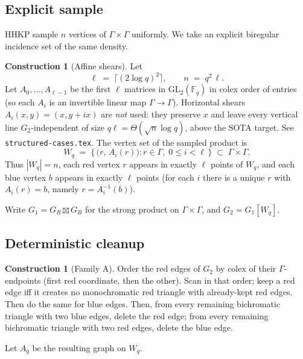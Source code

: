 \documentclass[11pt]{article}
\theoremstyle{definition}
\newtheorem{construction}[theorem]{Construction}
\newcommand{\F}{\mathbb{F}}
\begin{document}
\subsection{Explicit sample}

HHKP sample $n$ vertices of $\Gamma\times\Gamma$ uniformly.
We take an explicit biregular incidence set of the same density.

\begin{construction}[Affine shears]\label{con:sample}
Let
\[
  \ell \;=\; \bigl\lceil (2\log q)^{2}\bigr\rceil,
  \qquad
  n \;=\; q^{2}\,\ell.
\]
Let $A_0,\dots,A_{\ell-1}$ be the first $\ell$ matrices in $\mathrm{GL}_2(\F_q)$ in colex order of entries
(so each $A_i$ is an invertible linear map $\Gamma\to\Gamma$).
Horizontal shears $A_i(x,y)=(x,y+ix)$ are \emph{not} used: they preserve $x$ and leave every vertical line $G_2$-independent of size $q\ell=\Theta(\sqrt{n}\log q)$, above the SOTA target.
See \texttt{structured-cases.tex}.
The vertex set of the sampled product is
\[
  W_{q} \;=\; \bigl\{\,\bigl(r,\,A_{i}(r)\bigr):r\in\Gamma,\; 0\le i<\ell\,\bigr\}\;\subset\;\Gamma\times\Gamma.
\]
Thus $|W_{q}|=n$, each red vertex $r$ appears in exactly $\ell$ points of $W_{q}$, and each blue vertex $b$ appears in exactly $\ell$ points
(for each $i$ there is a unique $r$ with $A_{i}(r)=b$, namely $r=A_{i}^{-1}(b)$).
\end{construction}

Write $G_{1}=G_{R}\boxtimes G_{B}$ for the strong product on $\Gamma\times\Gamma$, and $G_{2}=G_{1}[W_{q}]$.

\subsection{Deterministic cleanup}

\begin{construction}[Family A]\label{con:A}
Order the red edges of $G_{2}$ by colex of their $\Gamma$-endpoints (first red coordinate, then the other).
Scan in that order; keep a red edge iff it creates no monochromatic red triangle with already-kept red edges.
Then do the same for blue edges.
Then, from every remaining bichromatic triangle with two blue edges, delete the red edge;
from every remaining bichromatic triangle with two red edges, delete the blue edge.

Let $A_{q}$ be the resulting graph on $W_{q}$.
\end{construction}
\end{document}
